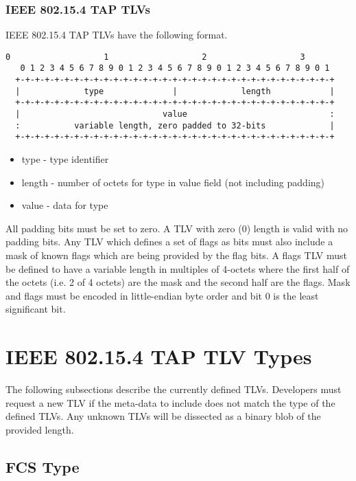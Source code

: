 \documentclass[12pt]{article}
\renewcommand\_{\textunderscore\allowbreak}
\begin{document}
\newpage
\subsubsection{IEEE 802.15.4 TAP TLVs}

IEEE 802.15.4 TAP TLVs have the following format.

\begin{Verbatim}[samepage=true]
   0                   1                   2                   3
   0 1 2 3 4 5 6 7 8 9 0 1 2 3 4 5 6 7 8 9 0 1 2 3 4 5 6 7 8 9 0 1
  +-+-+-+-+-+-+-+-+-+-+-+-+-+-+-+-+-+-+-+-+-+-+-+-+-+-+-+-+-+-+-+-+
  |             type              |             length            |
  +-+-+-+-+-+-+-+-+-+-+-+-+-+-+-+-+-+-+-+-+-+-+-+-+-+-+-+-+-+-+-+-+
  |                             value                             :
  :           variable length, zero padded to 32-bits             |
  +-+-+-+-+-+-+-+-+-+-+-+-+-+-+-+-+-+-+-+-+-+-+-+-+-+-+-+-+-+-+-+-+
\end{Verbatim}

\begin{itemize}
    \item type        - type identifier
    \item length      - number of octets for type in value field
                        (not including padding)
    \item value       - data for type
\end{itemize}
All padding bits must be set to zero.  A TLV with zero (0) length is valid with
no padding bits.  Any TLV which defines a set of flags as bits must also
include a mask of known flags which are being provided by the flag bits.  A
flags TLV must be defined to have a variable length in multiples of 4-octets
where the first half of the octets (i.e. 2 of 4 octets) are the mask and the
second half are the flags.  Mask and flags must be encoded in little-endian
byte order and bit 0 is the least significant bit.

\newpage
\section{IEEE 802.15.4 TAP TLV Types}

The following subsections describe the currently defined TLVs.  Developers must
request a new TLV if the meta-data to include does not match the type of the
defined TLVs.  Any unknown TLVs will be dissected as a binary blob of the
provided length.  

\subsection{FCS Type}
\end{document}
